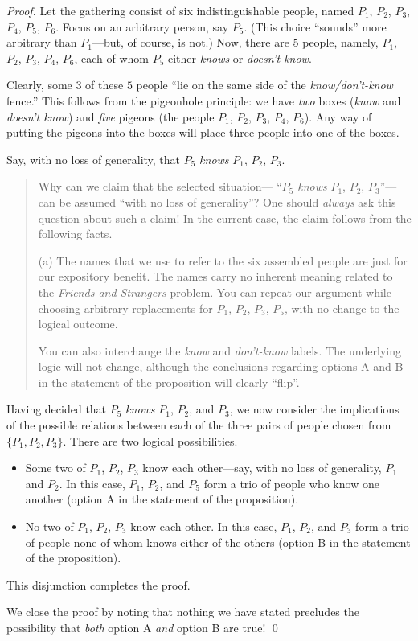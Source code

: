 \begin{proof}
Let the gathering consist of six indistinguishable people, named
$P_1$, $P_2$, $P_3$, $P_4$, $P_5$, $P_6$.  Focus on an arbitrary
person, say $P_5$.  (This choice ``sounds'' more arbitrary than
$P_1$---but, of course, is not.)  Now, there are $5$ people, namely,
$P_1$, $P_2$, $P_3$, $P_4$, $P_6$, each of whom $P_5$ either {\em
  knows} or {\em doesn't know}.

Clearly, some $3$ of these $5$ people ``lie on the same side of the
{\em know/don't-know} fence.''  This follows from the pigeonhole
principle: we have {\em two} boxes ({\em know} and {\em doesn't know})
and {\em five} pigeons (the people $P_1$, $P_2$, $P_3$, $P_4$, $P_6$).
Any way of putting the pigeons into the boxes will place three people
into one of the boxes.

Say, with no loss of generality, that $P_5$ {\em knows} $P_1$, $P_2$,
$P_3$.
\begin{quote}
Why can we claim that the selected situation--- ``$P_5$ {\em knows}
$P_1$, $P_2$, $P_3$''---can be assumed ``with no loss of generality''?
One should {\em always} ask this question about such a claim!  In the
current case, the claim follows from the following facts.

(a) The names that we use to refer to the six assembled people are
just for our expository benefit.  The names carry no inherent meaning
related to the {\it Friends and Strangers} problem.  You can repeat
our argument while choosing arbitrary replacements for $P_1$, $P_2$,
$P_3$, $P_5$, with no change to the logical outcome.

You can also interchange the {\em know} and {\em don't-know} labels.
The underlying logic will not change, although the conclusions
regarding options A and B in the statement of the proposition will
clearly ``flip''.
\end{quote}

Having decided that $P_5$ {\em knows} $P_1$, $P_2$, and $P_3$, we now
consider the implications of the possible relations between each of
the three pairs of people chosen from $\{P_1, P_2, P_3\}$.  There
are two logical possibilities.
\begin{itemize}
\item
Some two of $P_1$, $P_2$, $P_3$ know each other---say, with no loss of
generality, $P_1$ and $P_2$.  In this case, $P_1$, $P_2$, and $P_5$
form a trio of people who know one another (option A in the statement
of the proposition).
\item
No two of $P_1$, $P_2$, $P_3$ know each other.  In this case, $P_1$,
$P_2$, and $P_3$ form a trio of people none of whom knows either of
the others (option B in the statement of the proposition).
\end{itemize}
This disjunction completes the proof.

We close the proof by noting that nothing we have stated precludes the
possibility that {\em both} option A {\em and} option B are true!  \qed
\end{proof}


